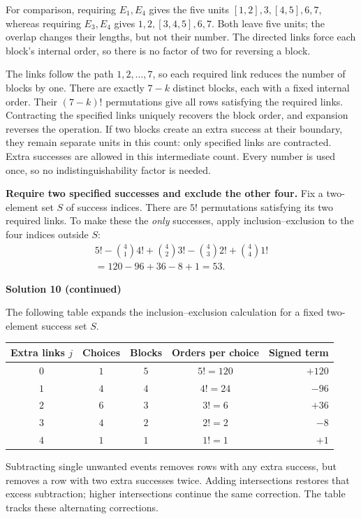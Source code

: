 \documentclass[11pt]{article}
\newcommand{\solution}[1]{%
  \par\Needspace{5\baselineskip}\addvspace{.8\baselineskip}%
  {\large\bfseries Solution #1\par}\nopagebreak[4]}
\begin{document}
For comparison, requiring $E_1,E_4$ gives the five units
$[1,2],3,[4,5],6,7$, whereas requiring $E_3,E_4$ gives
$1,2,[3,4,5],6,7$. Both leave five units; the overlap changes their
lengths, but not their number. The directed links force each block's
internal order, so there is no factor of two for reversing a block.

The links follow the path $1,2,\ldots,7$, so each required link reduces
the number of blocks by one. There are exactly $7-k$ distinct blocks,
each with a fixed internal order. Their $(7-k)!$ permutations give all
rows satisfying the required links. Contracting the specified links uniquely recovers the block order,
and expansion reverses the operation. If two blocks create an extra
success at their boundary, they remain separate units in this count:
only specified links are contracted. Extra successes are allowed in
this intermediate count. Every number is used once, so no indistinguishability
factor is needed.

\textbf{Require two specified successes and exclude the other four.}
Fix a two-element set $S$ of success indices. There are $5!$ permutations
satisfying its two required links. To make these the \emph{only} successes,
apply inclusion--exclusion to the four indices outside $S$:
\[
\begin{gathered}
5!-\binom41 4!+\binom42 3!-\binom43 2!+\binom44 1!\\
=120-96+36-8+1=53.
\end{gathered}
\]
\clearpage
\solution{10 (continued)}
The following table expands the inclusion--exclusion calculation for a fixed
two-element success set $S$.
\begin{center}
\renewcommand{\arraystretch}{1.15}
\begin{tabular}{@{}ccccr@{}}
\toprule
Extra links $j$ & Choices & Blocks & Orders per choice & Signed term \\
\midrule
$0$ & $1$ & $5$ & $5!=120$ & $+120$ \\
$1$ & $4$ & $4$ & $4!=24$ & $-96$ \\
$2$ & $6$ & $3$ & $3!=6$ & $+36$ \\
$3$ & $4$ & $2$ & $2!=2$ & $-8$ \\
$4$ & $1$ & $1$ & $1!=1$ & $+1$ \\
\bottomrule
\end{tabular}
\end{center}
Subtracting single unwanted events removes rows with any extra success,
but removes a row with two extra successes twice. Adding intersections
restores that excess subtraction; higher intersections continue the
same correction. The table tracks these alternating corrections.
\end{document}
